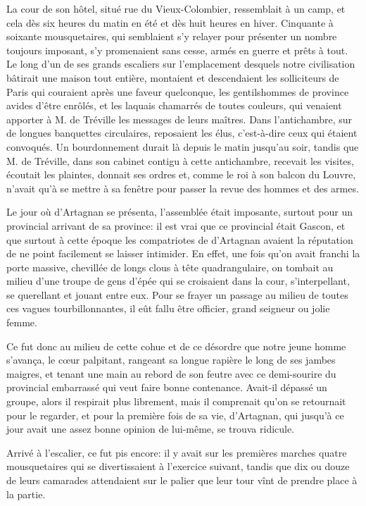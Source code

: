 La cour de son hôtel, situé rue du Vieux-Colombier, ressemblait à un camp, et cela dès six heures du matin en été et dès huit heures en hiver. Cinquante à soixante mousquetaires, qui semblaient s'y relayer pour présenter un nombre toujours imposant, s'y promenaient sans cesse, armés en guerre et prêts à tout. Le long d'un de ses grands escaliers sur l'emplacement desquels notre civilisation bâtirait une maison tout entière, montaient et descendaient les solliciteurs de Paris qui couraient après une faveur quelconque, les gentilshommes de province avides d'être enrôlés, et les laquais chamarrés de toutes couleurs, qui venaient apporter à M. de Tréville les messages de leurs maîtres. Dans l'antichambre, sur de longues banquettes circulaires, reposaient les élus, c'est-à-dire ceux qui étaient convoqués. Un bourdonnement durait là depuis le matin jusqu'au soir, tandis que M. de Tréville, dans son cabinet contigu à cette antichambre, recevait les visites, écoutait les plaintes, donnait ses ordres et, comme le roi à son balcon du Louvre, n'avait qu'à se mettre à sa fenêtre pour passer la revue des hommes et des armes. 

Le jour où d'Artagnan se présenta, l'assemblée était imposante, surtout pour un provincial arrivant de sa province: il est vrai que ce provincial était Gascon, et que surtout à cette époque les compatriotes de d'Artagnan avaient la réputation de ne point facilement se laisser intimider. En effet, une fois qu'on avait franchi la porte massive, chevillée de longs clous à tête quadrangulaire, on tombait au milieu d'une troupe de gens d'épée qui se croisaient dans la cour, s'interpellant, se querellant et jouant entre eux. Pour se frayer un passage au milieu de toutes ces vagues tourbillonnantes, il eût fallu être officier, grand seigneur ou jolie femme. 

Ce fut donc au milieu de cette cohue et de ce désordre que notre jeune homme s'avança, le cœur palpitant, rangeant sa longue rapière le long de ses jambes maigres, et tenant une main au rebord de son feutre avec ce demi-sourire du provincial embarrassé qui veut faire bonne contenance. Avait-il dépassé un groupe, alors il respirait plus librement, mais il comprenait qu'on se retournait pour le regarder, et pour la première fois de sa vie, d'Artagnan, qui jusqu'à ce jour avait une assez bonne opinion de lui-même, se trouva ridicule. 

Arrivé à l'escalier, ce fut pis encore: il y avait sur les premières marches quatre mousquetaires qui se divertissaient à l'exercice suivant, tandis que dix ou douze de leurs camarades attendaient sur le palier que leur tour vînt de prendre place à la partie. 

